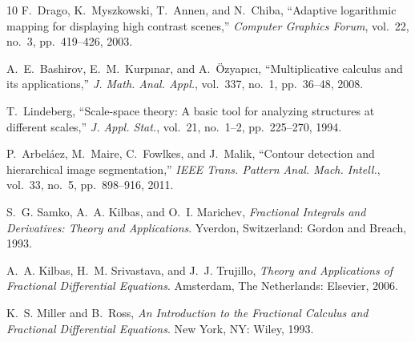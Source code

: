 \documentclass[conference]{IEEEtran}
\begin{document}
\begin{thebibliography}{10}
F.~Drago, K.~Myszkowski, T.~Annen, and N.~Chiba, ``Adaptive logarithmic
mapping for displaying high contrast scenes,'' \emph{Computer Graphics Forum},
vol.~22, no.~3, pp.~419--426, 2003.

A.~E.~Bashirov, E.~M.~Kurp{\i}nar, and A.~\"Ozyap{\i}c{\i}, ``Multiplicative
calculus and its applications,'' \emph{J. Math. Anal. Appl.}, vol.~337, no.~1,
pp.~36--48, 2008.

T.~Lindeberg, ``Scale-space theory: A basic tool for analyzing structures at
different scales,'' \emph{J. Appl. Stat.}, vol.~21, no.~1--2, pp.~225--270, 1994.

P.~Arbel\'aez, M.~Maire, C.~Fowlkes, and J.~Malik, ``Contour detection and
hierarchical image segmentation,'' \emph{IEEE Trans. Pattern Anal. Mach.
Intell.}, vol.~33, no.~5, pp.~898--916, 2011.

S.~G. Samko, A.~A. Kilbas, and O.~I. Marichev,
\emph{Fractional Integrals and Derivatives: Theory and Applications}.
Yverdon, Switzerland: Gordon and Breach, 1993.

A.~A. Kilbas, H.~M. Srivastava, and J.~J. Trujillo,
\emph{Theory and Applications of Fractional Differential Equations}.
Amsterdam, The Netherlands: Elsevier, 2006.

K.~S. Miller and B.~Ross,
\emph{An Introduction to the Fractional Calculus and Fractional Differential
Equations}.
New York, NY: Wiley, 1993.

\end{thebibliography}
\end{document}
